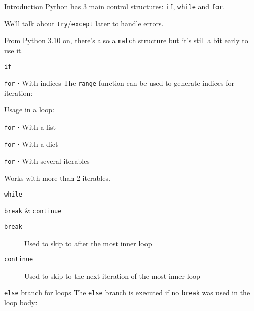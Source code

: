 \begin{frame}{Introduction}
  Python has 3 main control structures: \texttt{if}, \texttt{while} and \texttt{for}.

  We'll talk about \texttt{try}/\texttt{except} later to handle errors.

  From Python 3.10 on, there's also a \texttt{match} structure but it's still a bit early to use it.
\end{frame}

\begin{frame}{\texttt{if}}
\end{frame}

\begin{frame}{\texttt{for} ⋅ With indices}
  The \texttt{range} function can be used to generate indices for iteration:


  Usage in a loop:

\end{frame}

\begin{frame}{\texttt{for} ⋅ With a list}
\end{frame}

\begin{frame}{\texttt{for} ⋅ With a dict}
\end{frame}

\begin{frame}{\texttt{for} ⋅ With several iterables}

  Works with more than 2 iterables.
\end{frame}

\begin{frame}{\texttt{while}}
\end{frame}

\begin{frame}{\texttt{break} \& \texttt{continue}}
  \begin{description}
    \item[\texttt{break}] Used to skip to after the most inner loop
    \item[\texttt{continue}] Used to skip to the next iteration of the most inner loop
  \end{description}

\end{frame}

\begin{frame}{\texttt{else} branch for loops}
  The \texttt{else} branch is executed if no \texttt{break} was used in the loop body:

\end{frame}
